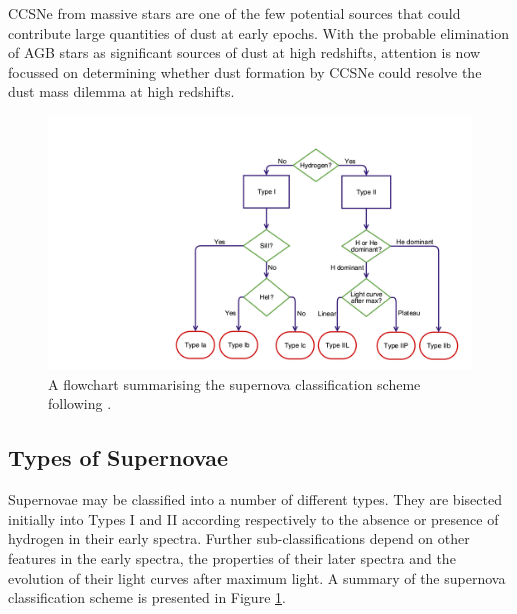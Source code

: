 CCSNe from massive stars are one of the few potential sources that could contribute large quantities of dust at early epochs.  With the probable elimination of  AGB stars as  significant sources of dust at high redshifts, attention is now focussed on determining whether dust formation by CCSNe could resolve the dust mass dilemma  at high redshifts.

\begin{figure}
\centering
\includegraphics[clip=true, scale = 0.2, trim= 930 50 55 210]{chapters/chapter1/figs/sn_classification.png}
\caption{A flowchart summarising the supernova classification scheme following \citet{Turatto2003}.}
\label{intro:fig:sn_class}
\end{figure}

\subsection{Types of Supernovae}

Supernovae may be classified into a number of different types.  They are bisected initially into Types I and II according respectively to the absence or presence of hydrogen in their early spectra.  Further sub-classifications depend on  other features in the early spectra, the properties of their later spectra and the evolution of their  light curves after maximum light.  A summary of the supernova classification scheme is presented in Figure \ref{intro:fig:sn_class}.  



